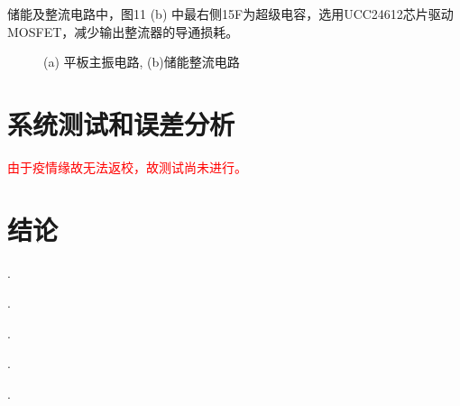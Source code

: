 \documentclass[UTF8]{ctexart}
\begin{document}
储能及整流电路中，图11 (b) 中最右侧15F为超级电容，选用UCC24612芯片驱动MOSFET，减少输出整流器的导通损耗。

\begin{figure}[H]   
	\centering	  
	\label{1a}\hfil	  
	\label{1b}
	\caption{ (a) 平板主振电路, (b)储能整流电路}
	\label{fig10} 
\end{figure}


\section{系统测试和误差分析}
\textcolor{red}{由于疫情缘故无法返校，故测试尚未进行。}
\section{结论}
.

.

.

.

.


\newpage
\end{document}
